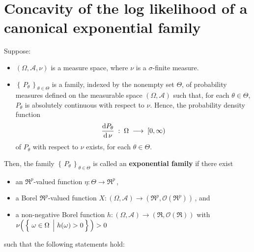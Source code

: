 

\section{Concavity of the log likelihood of a {\color{red}canonical} exponential family}
\setcounter{theorem}{0}
\setcounter{equation}{0}

\renewcommand{\theenumi}{\roman{enumi}}
\renewcommand{\labelenumi}{\textnormal{(\theenumi)}$\;\;$}


\begin{definition}
\mbox{}\vskip 0.1cm
\noindent
Suppose:
\begin{itemize}
\item
	$(\Omega,\mathcal{A},\nu)$ is a measure space, where $\nu$ is a $\sigma$-finite measure.
\item
	$\left\{\,P_{\theta}\,\right\}_{\theta \in \Theta}$ is a family, indexed by the nonempty set $\Theta$,
	of probability measures defined on the measurable space $(\Omega,\mathcal{A})$ such that,
	for each $\theta \in \Theta$, $P_{\theta}$ is absolutely continuous with respect to $\nu$.
	Hence, the probability density function
	\begin{equation*}
	\dfrac{\textnormal{d} P_{\theta}}{\textnormal{d}\,\nu} \; : \; \Omega \; \longrightarrow \; [0,\infty)
	\end{equation*}
	of $P_{\theta}$ with respect to $\nu$ exists, for each $\theta \in \Theta$.
\end{itemize}
Then, the family $\left\{\,P_{\theta}\,\right\}_{\theta \in \Theta}$ is called an \textbf{exponential family} if
there exist
\begin{itemize}
\item
	an $\Re^{p}$-valued function $\eta : \Theta \longrightarrow \Re^{p}$\,,
\item
	a Borel $\Re^{p}$-valued function $X : (\Omega,\mathcal{A}) \longrightarrow (\Re^{p},\mathcal{O}(\Re^{p}))$\,, and
\item
	a non-negative Borel function $h : (\Omega,\mathcal{A}) \longrightarrow (\Re,\mathcal{O}(\Re))$ with
	\,$\nu\!\left(\,\left\{\,\left.\omega\overset{{\color{white}.}}{\in}\Omega\,\;\right\vert\,h(\omega) > 0\,\right\}\,\right) > 0$
\end{itemize}
such that the following statements hold:

\end{definition}
